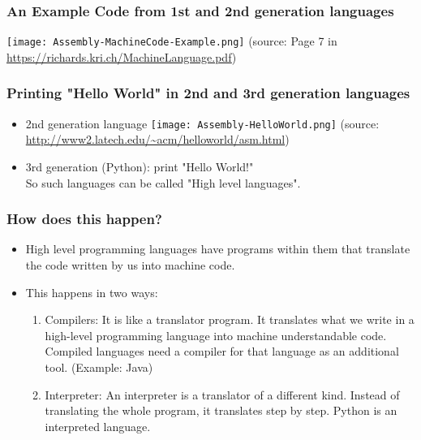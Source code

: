 \documentclass{beamer}
\begin{document}
\begin{frame}
\frametitle{An Example Code from 1st and 2nd generation languages}
\texttt{[image: Assembly-MachineCode-Example.png]}
\medskip (source: Page 7 in \url{https://richards.kri.ch/MachineLanguage.pdf})
\end{frame}

\begin{frame}
\frametitle{Printing "Hello World" in 2nd and 3rd generation languages}
\begin{itemize}
\item 2nd generation language
\texttt{[image: Assembly-HelloWorld.png]}
\medskip (source: \url{http://www2.latech.edu/~acm/helloworld/asm.html})
\item 3rd generation (Python): print "Hello World!"
\\ So such languages can be called "High level languages".
\end{itemize}
\end{frame}

\begin{frame}
\frametitle{How does this happen?}
\begin{itemize}
\item High level programming languages have programs within them that translate the code written by us into machine code.
\item This happens in two ways: 
\begin{enumerate}
\item Compilers: It is like a translator program. It translates what we write in a high-level programming language into machine understandable code.  Compiled languages need a compiler for that language as an additional tool. (Example: Java)
\item Interpreter: An interpreter is a translator of a different kind. Instead of translating the whole program, it translates step by step. Python is an interpreted language.
\end{enumerate}
\end{itemize}
\end{frame}
\end{document}
